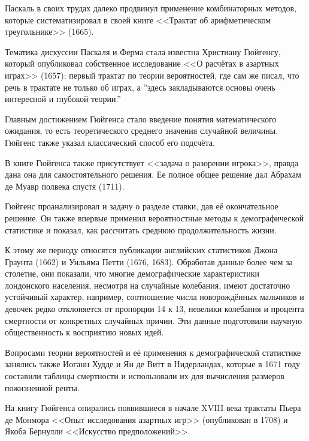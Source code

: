 \documentclass[12pt]{extarticle}
\begin{document}
Паскаль в своих трудах далеко продвинул применение комбинаторных методов, которые систематизировал в своей книге <<Трактат об арифметическом треугольнике>> (1665). 

Тематика дискуссии Паскаля и Ферма стала известна Христиану Гюйгенсу, который опубликовал собственное исследование <<О расчётах в азартных играх>> (1657): первый трактат по теории вероятностей, где сам же писал, что речь в трактате не только об играх, а ''здесь закладываются основы очень интересной и глубокой теории.''

Главным достижением Гюйгенса стало введение понятия математического ожидания, то есть теоретического среднего значения случайной величины. Гюйгенс также указал классический способ его подсчёта.

В книге Гюйгенса также присутствует <<задача о разорении игрока>>, правда дана она для самостоятельного решения. Ее полное общее решение дал Абрахам де Муавр полвека спустя (1711). 

Гюйгенс проанализировал и задачу о разделе ставки, дав её окончательное решение. Он также впервые применил вероятностные методы к демографической статистике и показал, как рассчитать среднюю продолжительность жизни.

К этому же периоду относятся публикации английских статистиков Джона Граунта (1662) и Уильяма Петти (1676, 1683). Обработав данные более чем за столетие, они показали, что многие демографические характеристики лондонского населения, несмотря на случайные колебания, имеют достаточно устойчивый характер, например, соотношение числа новорождённых мальчиков и девочек редко отклоняется от пропорции 14 к 13, невелики колебания и процента смертности от конкретных случайных причин. 
Эти данные подготовили научную общественность к восприятию новых идей.

Вопросами теории вероятностей и её применения к демографической статистике занялись также Иоганн Худде и Ян де Витт в Нидерландах, которые в 1671 году составили таблицы смертности и использовали их для вычисления размеров пожизненной ренты. 

На книгу Гюйгенса опирались появившиеся в начале XVIII века трактаты Пьера де Монмора <<Опыт исследования азартных игр>> (опубликован в 1708) и Якоба Бернулли <<Искусство предположений>>.
\end{document}
